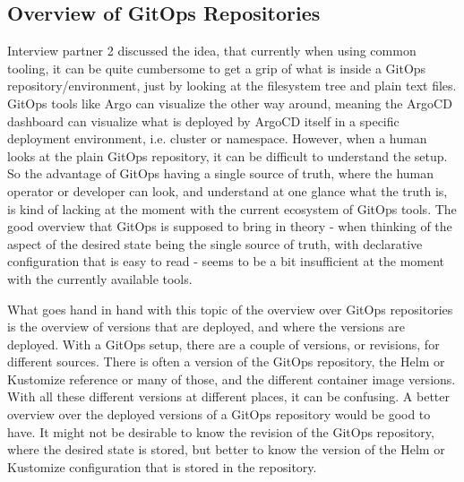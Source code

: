 \subsection{Overview of GitOps Repositories}

Interview partner 2 discussed the idea, that
currently when using common tooling,
it can be quite cumbersome to get a grip of what is inside a GitOps repository/environment,
just by looking at the filesystem tree and plain text files.
GitOps tools like Argo can visualize the other way around,
meaning the ArgoCD dashboard can visualize what is deployed by ArgoCD itself
in a specific deployment environment, i.e. cluster or namespace.
However, when a human looks at the plain GitOps repository,
it can be difficult to understand the setup.
So the advantage of GitOps having a single source of truth,
where the human operator or developer can look,
and understand at one glance what the truth is,
is kind of lacking at the moment with the current ecosystem of GitOps tools.
The good overview that GitOps is supposed to bring in theory
- when thinking of the aspect of the desired state being the single source of truth, with declarative configuration that is easy to read -
seems to be a bit insufficient at the moment with the currently available tools.

%

What goes hand in hand with this topic of the overview over GitOps repositories
is the overview of versions that are deployed,
and where the versions are deployed.
With a GitOps setup, there are a couple of versions, or revisions, for different sources.
There is often a version of the GitOps repository, the Helm or Kustomize reference or many of those,
and the different container image versions.
With all these different versions at different places,
it can be confusing.
A better overview over the deployed versions of a GitOps repository
would be good to have.
It might not be desirable to know the revision of the GitOps repository,
where the desired state is stored,
but better to know the version of the Helm or Kustomize configuration that is stored in the repository.

